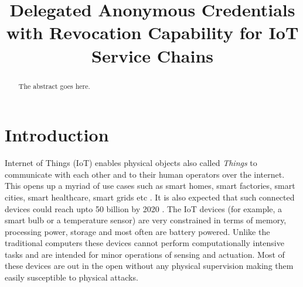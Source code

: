 \documentclass[journal]{IEEEtran}
\begin{document}
\def\HS{\hspace{\fontdimen2\font}}\the{}\font
\title{Delegated Anonymous Credentials with Revocation Capability for IoT Service Chains}
\author{

}

\IEEEoverridecommandlockouts
{}

\maketitle

\begin{abstract}
The abstract goes here.
\end{abstract}

\begin{IEEEkeywords}

\end{IEEEkeywords}

\IEEEpeerreviewmaketitle

\section{Introduction} \label{introduction}

Internet of Things (IoT) enables physical objects also called \textit{Things}  to communicate with each other and to their human operators over the internet. This opens up a myriad of use cases such as smart homes, smart factories, smart cities, smart healthcare, smart grids etc \cite{IoT}. It is also expected that such connected devices could reach upto 50 billion by 2020 \cite{Evans}. The IoT devices (for example, a smart bulb or a temperature sensor) are very constrained in terms of memory, processing power, storage and most often are battery powered. Unlike the traditional computers these devices cannot perform computationally intensive tasks and are intended for minor operations of sensing and actuation. Most of these devices are out in the open without any physical supervision making them easily susceptible to physical attacks.
\end{document}
